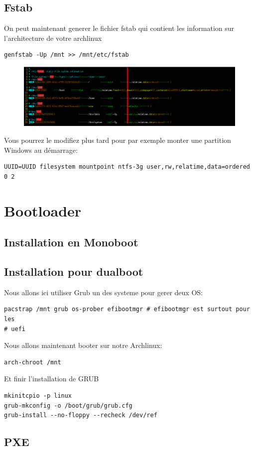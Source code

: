 \documentclass[a4paper]{book}
\begin{document}
\section{Fstab}
On peut maintenant generer le fichier fstab qui contient les information sur
l'architecture de votre archlinux
\begin{verbatim}
genfstab -Up /mnt >> /mnt/etc/fstab
\end{verbatim}
\begin{figure}[h]
  \includegraphics[width=13cm]{images/fstab}
\end{figure}
Vous pourrez le modifiez plus tard pour par exemple monter une partition
Windows au démarrage\@:
\begin{verbatim}
UUID=UUID filesystem mountpoint ntfs-3g user,rw,relatime,data=ordered 0 2
\end{verbatim}
\chapter{Bootloader}
\section{Installation en Monoboot}


\section{Installation pour dualboot}
Nous allons ici utiliser Grub un des systeme pour gerer deux OS\@:
\begin{verbatim}
pacstrap /mnt grub os-prober efibootmgr # efibootmgr est surtout pour les 
# uefi
\end{verbatim}
Nous allons maintenant booter sur notre Archlinux\@:
\begin{verbatim}
arch-chroot /mnt
\end{verbatim}
Et finir l'installation de GRUB
\begin{verbatim}
mkinitcpio -p linux
grub-mkconfig -o /boot/grub/grub.cfg
grub-install --no-floppy --recheck /dev/ref
\end{verbatim}
\section{PXE}
\end{document}

